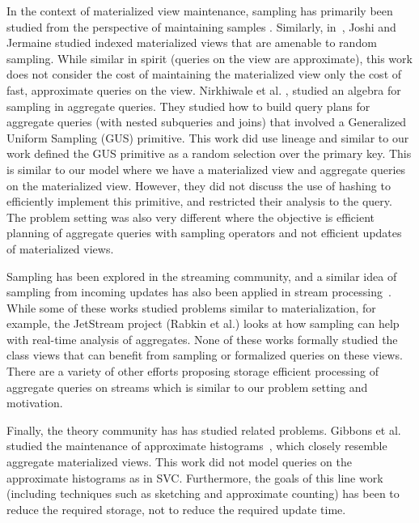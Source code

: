 In the context of materialized view maintenance, sampling has primarily been studied from the perspective of maintaining samples \cite{DBLP:conf/icde/OlkenR92}.
Similarly, in~\cite{joshi2008materialized}, Joshi and Jermaine studied indexed materialized views that are amenable to random sampling.
While similar in spirit (queries on the view are approximate), this work does not consider the cost of maintaining the materialized view only the cost of fast, approximate queries on the view.
Nirkhiwale et al. \cite{DBLP:journals/pvldb/NirkhiwaleDJ13}, studied an algebra for sampling in aggregate queries.
They studied how to build query plans for aggregate queries (with nested subqueries and joins) that involved a Generalized Uniform Sampling (GUS) primitive.
This work did use lineage and similar to our work defined the GUS primitive as a random selection over the primary key.
This is similar to our model where we have a materialized view and aggregate queries on the materialized view.
However, they did not discuss the use of hashing to efficiently implement this primitive, and restricted their analysis to the \sumfunc query.
The problem setting was also very different where the objective is efficient planning of aggregate queries with sampling operators and not efficient updates of materialized views.

Sampling has been explored in the streaming community, and a similar idea of sampling from incoming updates has also been applied in stream processing~\cite{tatbul2003load, Garofalakis, rabkin2014aggregation}.
While some of these works studied problems similar to materialization, for example, the JetStream project (Rabkin et al.) looks at how sampling can help with real-time analysis of aggregates.
None of these works formally studied the class views that can benefit from sampling or formalized queries on these views.
There are a variety of other efforts proposing storage efficient processing of aggregate queries on streams \cite{dobra2002processing, greenwald2001space} which is similar to our problem setting and motivation.

Finally, the theory community has has studied related problems.
Gibbons et al. studied the maintenance of approximate histograms~\cite{gibbons1997fast}, which closely resemble aggregate materialized views.
This work did not model queries on the approximate histograms as in SVC.
Furthermore, the goals of this line work (including techniques such as sketching and approximate counting) has been to reduce the required storage, not to reduce the required update time.

